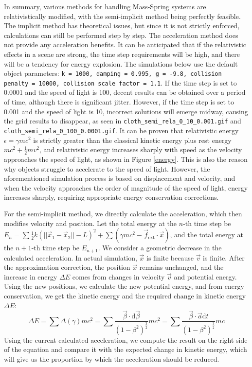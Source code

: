 \documentclass{article}
\begin{document}
In summary, various methods for handling Mass-Spring systems are relativistically modified, with the semi-implicit method being perfectly feasible. The implicit method has theoretical issues, but since it is not strictly enforced, calculations can still be performed step by step. The acceleration method does not provide any acceleration benefits. It can be anticipated that if the relativistic effects in a scene are strong, the time step requirements will be high, and there will be a tendency for energy explosion. The simulations below use the default object parameters: \lstinline|k = 1000, damping = 0.995, g = -9.8, collision penalty = 10000, collision scale factor = 1.1|. If the time step is set to 0.0001 and the speed of light is 100, decent results can be obtained over a period of time, although there is significant jitter. However, if the time step is set to 0.001 and the speed of light is 10, incorrect solutions will emerge midway, causing the grid results to disappear, as seen in \lstinline|cloth_semi_rela_0_10_0.001.gif| and \lstinline|cloth_semi_rela_0_100_0.0001.gif|. It can be proven that relativistic energy $\epsilon = \gamma mc^2$ is strictly greater than the classical kinetic energy plus rest energy $mc^2 + \frac{1}{2} mv^2$, and relativistic energy increases sharply with speed as the velocity approaches the speed of light, as shown in Figure \ref{energy}. This is also the reason why objects struggle to accelerate to the speed of light. However, the aforementioned simulation process is based on displacement and velocity, and when the velocity approaches the order of magnitude of the speed of light, energy increases sharply, requiring appropriate energy conservation corrections.

For the semi-implicit method, we directly calculate the acceleration, which then modifies velocity and position. Let the total energy at the $n$-th time step be $E_n = \sum \frac{1}{2} k (||\vec{x}_1 - \vec{x}_2|| - L)^2 + \sum (\gamma m c^2 - \vec{f}_{\text{ext}} \cdot \vec{x})$, and the total energy at the $n+1$-th time step be $E_{n+1}$. We consider a geometric decrease in the calculated acceleration. In actual simulation, $\vec{x}$ is finite because $\vec{v}$ is finite. After the approximation correction, the position $\vec{x}$ remains unchanged, and the increase in energy $\Delta E$ comes from changes in velocity $\vec{v}$ and potential energy. Using the new positions, we calculate the new potential energy, and from energy conservation, we get the kinetic energy and the required change in kinetic energy $\Delta E$:
$$ \Delta E = \sum \Delta(\gamma) m c^2 = \sum \frac{\vec{\beta} \cdot \mathrm{d} \vec{\beta}} {(1 - \beta^2)^{\frac{3}{2}}} mc^2 = \sum \frac{\vec{\beta} \cdot \vec{a} \mathrm{d} t} {(1 - \beta^2)^{\frac{3}{2}}} mc $$
Using the current calculated acceleration, we compute the result on the right side of the equation and compare it with the expected change in kinetic energy, which will give us the proportion by which the acceleration should be reduced.
\end{document}

